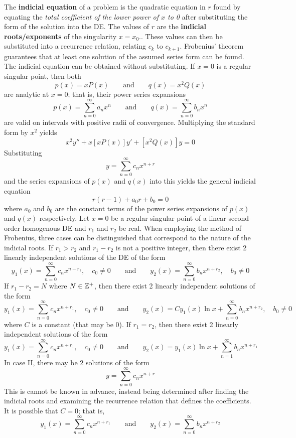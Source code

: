 \documentclass[./Differential Equations.tex]{subfiles}
\begin{document}
			The \textbf{indicial equation} of a problem is the quadratic equation in \(r\) found by equating the \textit{total coefficient of the lower power of \(x\) to 0} after substituting the form of the solution into the DE. The values of \(r\) are the \textbf{indicial roots/exponents} of the singularity \(x = x_0\).. These values can then be substituted into a recurrence relation, relating \(c_k\) to \(c_{k + 1}\). Frobenius' theorem guarantees that at least one solution of the assumed series form can be found. \\
			The indicial equation can be obtained without substituting. If \(x = 0\) is a regular singular point, then both 
				\[
					p(x) = xP(x) \qquad \text{and} \qquad
					q(x) = x^2Q(x)
				\]
				are analytic at \(x = 0\); that is, their power series expansions 
					\[
						p(x) = \sum_{n = 0}^\infty a_nx^n \qquad \text{and} \qquad
						q(x) = \sum_{n = 0}^\infty b_nx^n
					\]
				are valid on intervals with positive radii of convergence. Multiplying the standard form by \(x^2\) yields
				\[x^2y'' + x[xP(x)]y' + [x^2Q(x)]y = 0\]
				Substituting
				\[y = \sum_{n = 0}^\infty c_nx^{n + r}\]
				and the series expansions of \(p(x)\) and \(q(x)\) into this yields the general indicial equation
				\[r(r - 1) + a_0r + b_0 = 0\]
				where \(a_0\) and \(b_0\) are the constant terms of the power series expansions of \(p(x)\) and \(q(x)\) respectively.
			Let \(x = 0\) be a regular singular point of a linear second-order homogenous DE and \(r_1\) and \(r_2\) be real. When employing the method of Frobenius, three cases can be distinguished that correspond to the nature of the indicial roots.
				If \(r_1 > r_2\) and \(r_1 - r_2\) is not a positive integer, then there exist 2 linearly independent solutions of the DE of the form
					\[
						y_1(x) = \sum_{n = 0}^\infty c_nx^{n + r_1}, \quad c_0 \ne 0 \qquad \text{and} \qquad
						y_2(x) = \sum_{n = 0}^\infty b_nx^{n + r_2}, \quad b_0 \ne 0
					\]
				If \(r_1 - r_2 = N\) where \(N \in \mathbb{Z}^+\), then there exist 2 linearly independent solutions of the form
					\[
						y_1(x) = \sum_{n = 0}^\infty c_nx^{n + r_1}, \quad c_0 \ne 0 \qquad \text{and} \qquad
						y_2(x) = Cy_1(x)\ln x + \sum_{n = 0}^\infty b_nx^{n + r_2}, \quad b_0 \ne 0
					\]
					where \(C\) is a constant (that may be 0).
				If \(r_1 = r_2\), then there exist 2 linearly independent solutions of the form
					\[
						y_1(x) = \sum_{n = 0}^\infty c_nx^{n + r_1}, \quad c_0 \ne 0 \qquad \text{and} \qquad
						y_2(x) = y_1(x)\ln x + \sum_{n = 1}^\infty b_nx^{n + r_1}
					\]
			In case II, there may be 2 solutions of the form
				\[y = \sum_{n = 0}^\infty c_nx^{n + r}\]
				This is cannot be known in advance, instead being determined after finding the indicial roots and examining the recurrence relation that defines the coefficients. It is possible that \(C = 0\); that is,
				\[
					y_1(x) = \sum_{n = 0}^\infty c_nx^{n + r_1} \qquad \text{and} \qquad
					y_2(x) = \sum_{n = 0}^\infty b_nx^{n + r_2}
				\]
\end{document}
